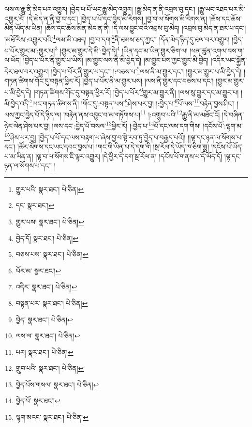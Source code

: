 ལས་ལ་རྒྱུ་ནི་མེད་པར་འགྱུར། །བྱེད་པ་པོ་ཡང་རྒྱུ་མེད་འགྱུར། །རྒྱུ་མེད་ན་ནི་འབྲས་བུ་དང་། །རྒྱུ་ཡང་འཐད་པར་མི་འགྱུར་རོ། །དེ་མེད་ན་ནི་བྱ་བ་དང་། །བྱེད་པ་པོ་དང་བྱེད་མི་རིགས། །བྱ་བ་ལ་སོགས་མི་རིགས་ན། །ཆོས་དང་ཆོས་མིན་ཡོད་མ་ཡིན། །ཆོས་དང་ཆོས་མིན་མེད་ན་ནི། །དེ་ལས་བྱུང་བའི་འབྲས་བུ་མེད། །འབྲས་བུ་མེད་ན་ཐར་པ་དང་། །མཐོ་རིས་:འགྱུར་བའི་\footnote{གྱུར་པའི་  སྣར་ཐང་།  པེ་ཅིན། }ལམ་མི་འཐད། །བྱ་བ་དག་\footnote{དང་  སྣར་ཐང་། }ནི་ཐམས་ཅད་ཀྱང་། །དོན་མེད་ཉིད་དུ་ཐལ་བར་འགྱུར། །བྱེད་པ་པོར་གྱུར་མ་:གྱུར་པ།\footnote{གྱུར་པས།  སྣར་ཐང་།  པེ་ཅིན། } །གྱུར་མ་གྱུར་དེ་མི་:བྱེད་དེ།\footnote{བྱེད་དོ།  སྣར་ཐང་།  པེ་ཅིན། } །ཡིན་དང་མ་ཡིན་གྱུར་ཅིག་ལ། །ཕན་ཚུན་འགལ་བས་ག་ལ་ཡོད། །བྱེད་པ་པོར་ནི་གྱུར་པ་ཡིས། །མ་གྱུར་ལས་ནི་མི་བྱེད་དེ། །མ་གྱུར་པས་ཀྱང་གྱུར་མི་བྱེད། །འདིར་ཡང་སྐྱོན་དེར་ཐལ་བར་འགྱུར། །བྱེད་པ་པོར་ནི་གྱུར་པ་དང་། །:བཅས་པ་\footnote{བཅས་པས་  སྣར་ཐང་།  པེ་ཅིན། }ལས་ནི་མ་གྱུར་དང་། །གྱུར་མ་གྱུར་པ་མི་བྱེད་དེ། །གཏན་ཚིགས་གོང་དུ་བསྟན་ཕྱིར་རོ། །བྱེད་པ་པོར་ནི་མ་གྱུར་པས། །ལས་ནི་གྱུར་དང་བཅས་པ་དང་། །གྱུར་མ་གྱུར་པ་མི་བྱེད་དེ། །གཏན་ཚིགས་གོང་དུ་བསྟན་ཕྱིར་རོ། །བྱེད་པ་པོར་\footnote{པོར་མ་  སྣར་ཐང་། }གྱུར་མ་གྱུར་ནི། །ལས་སུ་གྱུར་དང་མ་གྱུར་པ། །མི་བྱེད་འདི་\footnote{འདིར་  སྣར་ཐང་།  པེ་ཅིན། }ཡང་གཏན་ཚིགས་ནི། །གོང་དུ་:བསྟན་པས་\footnote{བསྟན་པར་  སྣར་ཐང་།  པེ་ཅིན། }ཤེས་པར་བྱ། །:བྱེད་པ་\footnote{བྱེད་  སྣར་ཐང་།  པེ་ཅིན། }པོ་ལས་\footnote{ལས་ལ་  སྣར་ཐང་།  པེ་ཅིན། }བརྟེན་བྱས་ཤིང་། །ལས་ཀྱང་བྱེད་པོ་དེ་ཉིད་ལ། །བརྟེན་ནས་འབྱུང་བ་མ་གཏོགས་པ།\footnote{པར།  སྣར་ཐང་།  པེ་ཅིན། } །:འགྲུབ་པའི་\footnote{གྲུབ་པའི་  སྣར་ཐང་།  པེ་ཅིན། }རྒྱུ་ནི་མ་མཐོང་ངོ། །དེ་བཞིན་ཉེར་ལེན་ཤེས་པར་བྱ། །ལས་དང་:བྱེད་པོ་བསལ་\footnote{བྱེད་པོས་གསལ་  སྣར་ཐང་།  པེ་ཅིན། }ཕྱིར་རོ། །:བྱེད་པ་\footnote{བྱེད་པོ་  སྣར་ཐང་། }པོ་དང་ལས་དག་གིས། །དངོས་པོ་:ལྷག་མ་\footnote{ལྷག་མའང་  སྣར་ཐང་།  པེ་ཅིན། }ཤེས་པར་བྱ། །བྱེད་པ་པོ་དང་ལས་བརྟག་པ་ཞེས་བྱ་བ་སྟེ་རབ་ཏུ་བྱེད་པ་བརྒྱད་པའོ།། །།ལྟ་དང་ཉན་ལ་སོགས་པ་དང་། །ཚོར་སོགས་དང་ཡང་དབང་བྱས་པ། །གང་གི་ཡིན་པ་དེ་དག་གི །སྔ་རོལ་དེ་ཡོད་ཁ་ཅིག་སྨྲ། །དངོས་པོ་ཡོད་པ་མ་ཡིན་ན། །ལྟ་བ་ལ་སོགས་ཇི་ལྟར་འགྱུར། །དེ་ཕྱིར་དེ་དག་སྔ་རོལ་ན། །དངོས་པོ་གནས་པ་དེ་ཡོད་དོ། །ལྟ་དང་ཉན་ལ་སོགས་པ་དང་། །
